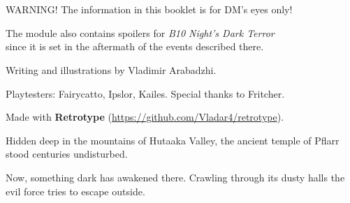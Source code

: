 \documentclass[english,11pt,openany,letterpaper,twocolumn]{book}
\def\author{Vladimir Arabadzhi}
\begin{document}
\setcounter{tocdepth}{0}
\renewcommand{\cftchapleader}{\normalfont\cftdotfill{\cftdotsep}}

\makeatletter
{}
\chapter*{\contentsname
	\@mkboth{%
		\MakeUppercase\contentsname}{\MakeUppercase\contentsname}}%
%
\makeatother

\vfill

\noindent
\begin{minipage}{\textwidth}
\begin{tabbox}[8][8]
\begin{uheaderbox}{WARNING!}
	\centering
	The information in this booklet is for DM's eyes only!
	
	The module also contains spoilers for \emph{B10 Night's Dark Terror}\\since it is set in the aftermath of the events described there.
\end{uheaderbox}
\end{tabbox}
\end{minipage}

\vfill

\noindent
\begin{minipage}{\textwidth}
	\centering
	Writing and illustrations by \author{}.
	
	Playtesters: Fairycatto, Ipslor, Kailes. Special thanks to Fritcher.
	
	Made with \textbf{Retrotype} (\href{https://github.com/Vladar4/retrotype}{https://github.com/Vladar4/retrotype}).
\end{minipage}

\break
\vspace*{1.1\baselineskip}

Hidden deep in the mountains of Hutaaka Valley, the ancient temple of Pflarr stood centuries undisturbed.

Now, something dark has awakened there. Crawling through its dusty halls the evil force tries to escape outside.

\vfill
\end{document}
